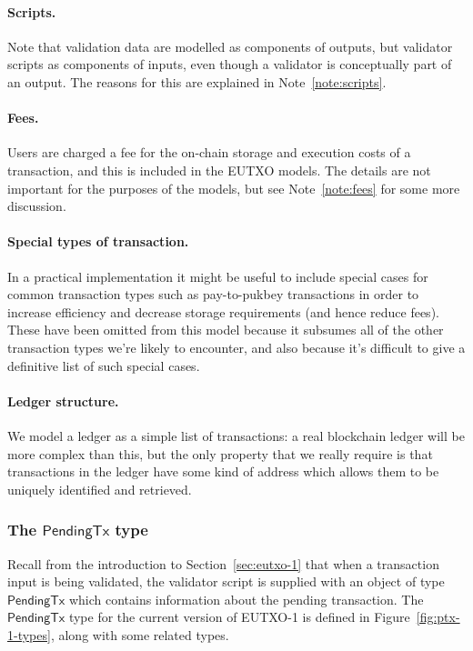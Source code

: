\documentclass[a4paper]{article}
\newcounter{note}
\newcommand{\todompj}[1]{\todo[inline,color=yellow!40,author=Michael]{#1}}
\newcommand{\s}{\textsf}  %
\newcommand{\ptx}{\ensuremath{\s{PendingTx}}}
\begin{document}

\paragraph{Scripts.} Note that validation data are modelled as components
of outputs, but validator scripts as components of inputs, even though
a validator is conceptually part of an output.  The reasons for this
are explained in Note~\ref{note:scripts}.

\paragraph{Fees.}  Users are charged a fee for the on-chain storage
and execution costs of a transaction, and this is included in the
EUTXO models.  The details are not important for the purposes of the
models, but see Note~\ref{note:fees} for some more discussion.

\paragraph{Special types of transaction.} In a practical
implementation it might be useful to include special cases for common
transaction types such as pay-to-pukbey transactions in order to
increase efficiency and decrease storage requirements (and hence
reduce fees).  These have been omitted from this model because it
subsumes all of the other transaction types we're likely to encounter,
and also because it's difficult to give a definitive list of such
special cases.

\paragraph{Ledger structure.} We model a ledger as a simple
list of transactions: a real blockchain ledger will be more complex
than this, but the only property that we really require is that
transactions in the ledger have some kind of address which allows them
to be uniquely identified and retrieved.

\subsubsection{The \ptx{} type}
\label{sec:pendingtx}
Recall from the introduction to Section~\ref{sec:eutxo-1} that when a
transaction input is being validated, the validator script is supplied
with an object of type \ptx{} which contains information about the
pending transaction.  The \ptx{} type for the current version of
EUTXO-1 is defined in Figure~\ref{fig:ptx-1-types}, along with some
related types.
\end{document}
